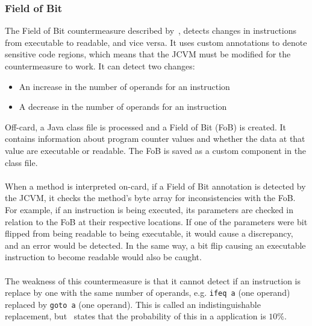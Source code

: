 \subsubsection{Field of Bit}
The Field of Bit countermeasure described by~\cite{evsmc}, detects changes in instructions from executable to readable, and vice versa. It uses custom annotations to denote sensitive code regions, which means that the JCVM must be modified for the countermeasure to work. It can detect two changes:

\begin{itemize}
\item An increase in the number of operands for an instruction
\item A decrease in the number of operands for an instruction
\end{itemize}
\noindent Off-card, a Java class file is processed and a Field of Bit (FoB) is created. It contains information about program counter values and whether the data at that value are executable or readable. The FoB is saved as a custom component in the class file.\\\\
When a method is interpreted on-card, if a Field of Bit annotation is detected by the JCVM, it checks the method's byte array for inconsistencies with the FoB. For example, if an instruction is being executed, its parameters are checked in relation to the FoB at their respective locations. If one of the parameters were bit flipped from being readable to being executable, it would cause a discrepancy, and an error would be detected. In the same way, a bit flip causing an executable instruction to become readable would also be caught.\\\\
The weakness of this countermeasure is that it cannot detect if an instruction is replace by one with the same number of operands, e.g. \texttt{ifeq a} (one operand) replaced by \texttt{goto a} (one operand). This is called an indistinguishable replacement, but~\cite[p. 54]{evsmc} states that the probability of this in a \jc application is $10\%$.